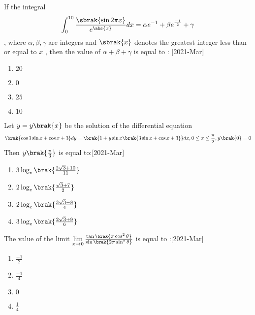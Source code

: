    \item If the integral
   \begin{align}    
   \int_0^{10} \frac{\sbrak{\sin{2\pi x}}}{e^{\abs{x}}} dx = \alpha{e^{-1}} + \beta{e^{\frac{-1}{2}}} + \gamma 
   \end{align}
   , where $\alpha  , \beta , \gamma$ are integers and $\sbrak{x}$ denotes the greatest integer less than or equal to $x$ , then the value of $\alpha + \beta + \gamma$ is equal to : \hfill[2021-Mar]
   \begin{multicols}{2}
       \begin{enumerate}
           \item $20$
           \item $0$\\
           \item $25$
           \item $10$
       \end{enumerate}
   \end{multicols}
   \item Let $y = y\brak{x}$ be the solution of the differential equation
   \begin{align}
   \brak{\cos{3\sin{x} + \cos{x} + 3 }}dy = \brak{1 + y\sin{x}\brak{3\sin{x}+ \cos{x} +3}}dx , 0 \leq x \leq \frac{\pi}{2}, y\brak{0}=0
   \end{align}
   Then $y\brak{\frac{\pi}{3}}$ is equal to:\hfill[2021-Mar]
   \begin{multicols}{2}
       \begin{enumerate}
           \item $3\log_e \brak{\frac{2\sqrt{3}+10}{11}}$\\
           \item $2\log_e \brak{\frac{\sqrt{3}+7}{2}}$
           \item $2\log_e \brak{\frac{3\sqrt{3}-8}{4}}$\\
           \item $3\log_e \brak{\frac{2\sqrt{3}+9}{6}}$
       \end{enumerate}
   \end{multicols}
   \item The value of the limit $\lim\limits_{x \to 0} \frac{\tan{\brak{\pi \cos^2{\theta}}}}{\sin \brak{2 \pi \sin^2{\theta}}}$ is equal to :\hfill[2021-Mar]
   \begin{multicols}{2}
   \begin{enumerate}
       \item $\frac{-1}{2}$\\
       \item $\frac{-1}{4}$
       \item $0$\\
       \item $\frac{1}{4}$
   \end{enumerate}
   \end{multicols}
